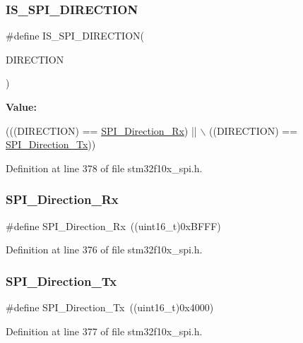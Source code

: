 \subsubsection{\texorpdfstring{I\+S\+\_\+\+S\+P\+I\+\_\+\+D\+I\+R\+E\+C\+T\+I\+ON}{IS\_SPI\_DIRECTION}}
{\footnotesize\ttfamily \#define I\+S\+\_\+\+S\+P\+I\+\_\+\+D\+I\+R\+E\+C\+T\+I\+ON(\begin{DoxyParamCaption}\item[{}]{D\+I\+R\+E\+C\+T\+I\+ON }\end{DoxyParamCaption})}

{\bfseries Value\+:}
\begin{DoxyCode}
(((DIRECTION) == \hyperlink{group___s_p_i__direction__transmit__receive_ga9a59d225a8cf42eebafbec6ad95c078c}{SPI\_Direction\_Rx}) || \(\backslash\)
                                     ((DIRECTION) == \hyperlink{group___s_p_i__direction__transmit__receive_gabd76982a7e305c13f7ad8ea1789d3c0c}{SPI\_Direction\_Tx}))
\end{DoxyCode}


Definition at line 378 of file stm32f10x\+\_\+spi.\+h.

\mbox{\label{group___s_p_i__direction__transmit__receive_ga9a59d225a8cf42eebafbec6ad95c078c}} 
\subsubsection{\texorpdfstring{S\+P\+I\+\_\+\+Direction\+\_\+\+Rx}{SPI\_Direction\_Rx}}
{\footnotesize\ttfamily \#define S\+P\+I\+\_\+\+Direction\+\_\+\+Rx~((uint16\+\_\+t)0x\+B\+F\+F\+F)}



Definition at line 376 of file stm32f10x\+\_\+spi.\+h.

\mbox{\label{group___s_p_i__direction__transmit__receive_gabd76982a7e305c13f7ad8ea1789d3c0c}} 
\subsubsection{\texorpdfstring{S\+P\+I\+\_\+\+Direction\+\_\+\+Tx}{SPI\_Direction\_Tx}}
{\footnotesize\ttfamily \#define S\+P\+I\+\_\+\+Direction\+\_\+\+Tx~((uint16\+\_\+t)0x4000)}



Definition at line 377 of file stm32f10x\+\_\+spi.\+h.

